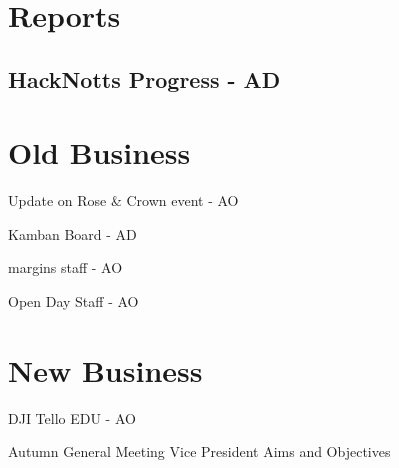 \documentclass[11pt, agenda]{meetingmins}
\begin{document}
\maketitle

\section{Reports}

\subsection{HackNotts Progress - AD}
\begin{hiddensubitems}
\item
\end{hiddensubitems}

\section{Old Business}
\begin{items}
	\item Update on Rose \& Crown event - AO
	\item Kamban Board - AD
	\item margins staff - AO
	\item Open Day Staff - AO
\end{items}

\section{New Business}
\begin{items}
	\item DJI Tello EDU - AO
	\item Autumn General Meeting
		\subitem Vice President
		\subitem Aims and Objectives
\end{items}

\vspace{1em}
\nextmeeting{}
\end{document}
